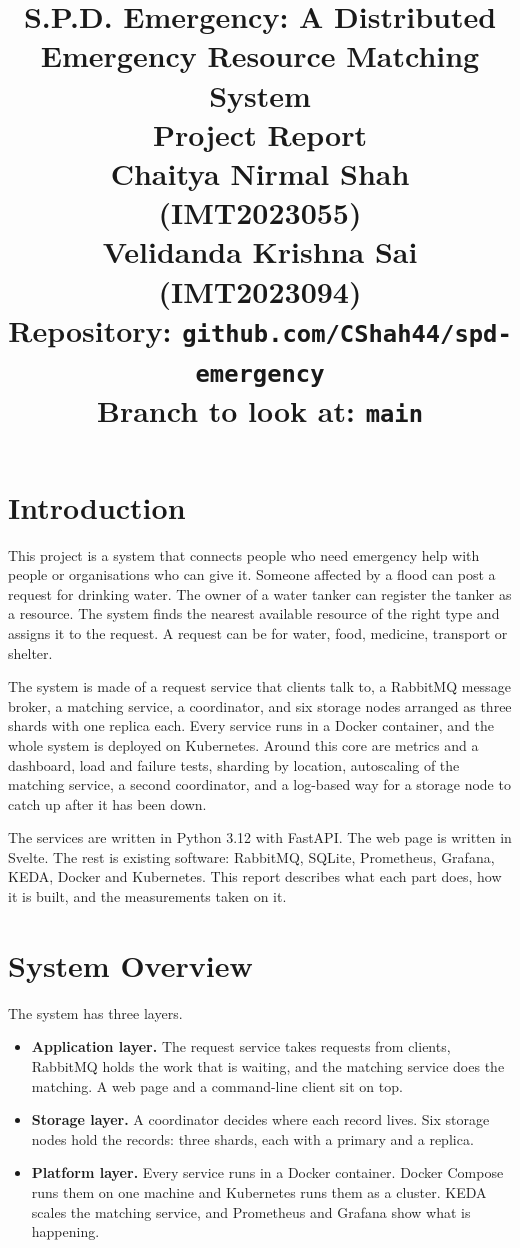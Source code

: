 \documentclass[a4paper,10pt]{article}
\title{\Large\textbf{S.P.D. Emergency: A Distributed Emergency Resource Matching System} \\
    \normalsize Project Report \\
    \normalsize Chaitya Nirmal Shah (IMT2023055) \\
    \normalsize Velidanda Krishna Sai (IMT2023094) \\[6pt]
    \normalsize Repository: \texttt{github.com/CShah44/spd-emergency} \\
    \normalsize Branch to look at: \texttt{main} \\
    }
\date{}
\begin{document}
\maketitle
\thispagestyle{fancy}

\section{Introduction}

This project is a system that connects people who need emergency help with people or
organisations who can give it. Someone affected by a flood can post a request for drinking
water. The owner of a water tanker can register the tanker as a resource. The system finds the
nearest available resource of the right type and assigns it to the request. A request can be for
water, food, medicine, transport or shelter.

The system is made of a request service that clients talk to, a RabbitMQ message broker, a
matching service, a coordinator, and six storage nodes arranged as three shards with one replica
each. Every service runs in a Docker container, and the whole system is deployed on Kubernetes.
Around this core are metrics and a dashboard, load and failure tests, sharding by location,
autoscaling of the matching service, a second coordinator, and a log-based way for a storage node
to catch up after it has been down.

The services are written in Python 3.12 with FastAPI. The web page is written in Svelte. The rest
is existing software: RabbitMQ, SQLite, Prometheus, Grafana, KEDA, Docker and Kubernetes. This
report describes what each part does, how it is built, and the measurements taken on it.

\section{System Overview}

The system has three layers.
\begin{itemize}
    \item \textbf{Application layer.} The request service takes requests from clients, RabbitMQ
    holds the work that is waiting, and the matching service does the matching. A web page and a
    command-line client sit on top.
    \item \textbf{Storage layer.} A coordinator decides where each record lives. Six storage nodes
    hold the records: three shards, each with a primary and a replica.
    \item \textbf{Platform layer.} Every service runs in a Docker container. Docker Compose runs
    them on one machine and Kubernetes runs them as a cluster. KEDA scales the matching service,
    and Prometheus and Grafana show what is happening.
\end{itemize}
\end{document}
